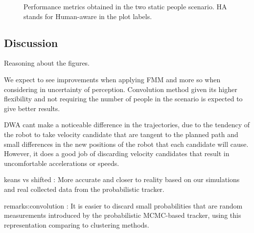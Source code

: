 \begin{figure}[t!]
%

\caption{Performance metrics obtained in the two static people scenario. HA stands for Human-aware in the plot labels.}
\label{fig:boxplots_2people}
\end{figure}


\subsection{Discussion}
\label{sec:discussion}

Reasoning about the figures.

We expect to see improvements when applying FMM and more so when considering in uncertainty of perception. Convolution method given its higher flexibility and not requiring the number of people in the scenario is expected to give better results.

DWA cant make a noticeable difference in the trajectories, due to the tendency of the robot to take velocity candidate that are tangent to the planned path and small differences in the new positions of the robot that each candidate will cause. However, it does a good job of discarding velocity candidates that result in uncomfortable accelerations or speeds.


keans vs shifted : 
 More accurate and closer to reality based on our simulations and real collected data from the probabilistic tracker.
 
remarks:convolution : It is easier to discard small probabilities that are random measurements introduced by the probabilistic MCMC-based tracker, using this representation comparing to clustering methods.
